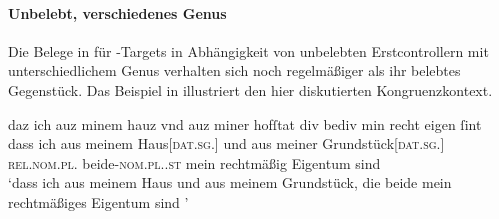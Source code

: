
\paragraph{Unbelebt, verschiedenes Genus}

Die Belege in  für -Targets in
Abhängigkeit von unbelebten Erstcontrollern mit
unterschiedlichem Genus verhalten sich noch regelmäßiger als ihr
belebtes Gegenstück. Das Beispiel in 
illustriert den hier diskutierten Kongruenzkontext.

\begin{exe}
\ex \label{ex:cao_diffgend_inan}
		\gll daz ich auz minem hauz vnd auz miner hofſtat
				div bediv min recht eigen ſint \textelp{} \\
			dass ich aus meinem Haus[\textsc{dat.sg.\NeutI}] und aus meiner
				Grundstück[\textsc{dat.sg.\FemI}] \textsc{rel.nom.pl.\NeutI}
				beide-\textsc{nom.pl.\NeutI.st} mein rechtmäßig Eigentum sind \\
		\trans `dass ich aus meinem Haus und aus meinem Grundstück, die 
			beide mein rechtmäßiges Eigentum sind \textelp{}'
			\parencites(Nr.~1282, Regensburg, 1290)[526,37--38]{cao2}

\end{exe}

